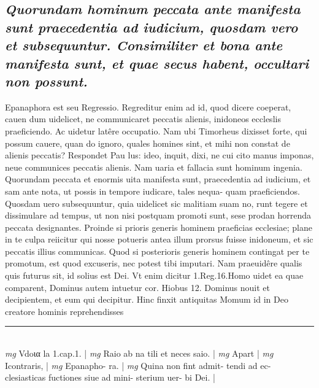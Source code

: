 \documentclass{article}
\begin{document}
\begin{pages}
{}
\subsection*{\textit{Quorundam hominum peccata ante manifesta sunt praecedentia ad iudicium, quosdam vero et subsequuntur. Consimiliter et bona ante manifesta sunt, et quae secus habent, occultari non possunt. }}\pstart Epanaphora est seu Regressio. Regreditur enim ad id, quod dicere coeperat, cauen dum uidelicet, ne communicaret peccatis alienis, inidoneos eccleslis praeficiendo. Ac uidetur latêre occupatio. Nam ubi Timorheus dixisset forte, qui possum cauere, quan do ignoro, quales homines sint, et mihi non constat de alienis peccatis? Respondet Pau lus: ideo, inquit, dixi, ne cui cito manus imponas, neue communices peccatis alienis. Nam uaria et fallacia sunt hominum ingenia. Quorundam peccata et enormis uita manifesta sunt, praecedentia ad iudicium, et sam ante nota, ut possis in tempore iudicare, tales nequa- quam praeficiendos. Quosdam uero subsequuntur, quia uidelicet sic malitiam suam no, runt tegere et dissimulare ad tempus, ut non nisi postquam promoti sunt, sese prodan horrenda peccata designantes. Proinde si prioris generis hominem praeficias ecclesiae; plane in te culpa reiicitur qui nosse potueris antea illum prorsus fuisse inidoneum, et sic peccatis illius communicas. Quod si posterioris generis hominem contingat per te promotum, est quod excuseris, nec potest tibi imputari. Nam praeuidêre qualis quis futurus sit, id solius est Dei. Vt enim dicitur 1.Reg.16.Homo uidet ea quae comparent, Dominus autem intuetur cor. Hiobus 12. Dominus nouit et decipientem, et eum qui decipitur. Hinc finxit antiquitas Momum id in Deo creatore hominis reprehendisses  \pend
\vspace{0.5cm}\noindent
\vspace{0.2cm}\rule{1cm}{0.2pt}\\ 
\hspace{0.2cm}\textit{mg}
\footnotesize Vdoια la 1.cap.1. 
\normalsize| 
\hspace{0.2cm}\textit{mg}
\footnotesize Raio ab na tili et neces saio. 
\normalsize| 
\hspace{0.2cm}\textit{mg}
\footnotesize Apart 
\normalsize| 
\hspace{0.2cm}\textit{mg}
\footnotesize Icontraris, 
\normalsize| 
\hspace{0.2cm}\textit{mg}
\footnotesize Epanapho- ra. 
\normalsize| 
\hspace{0.2cm}\textit{mg}
\footnotesize Quina non fint admit- tendi ad ec- clesiasticas fuctiones siue ad mini- sterium uer- bi Dei. 
\normalsize| 

\end{pages}
\end{document}
